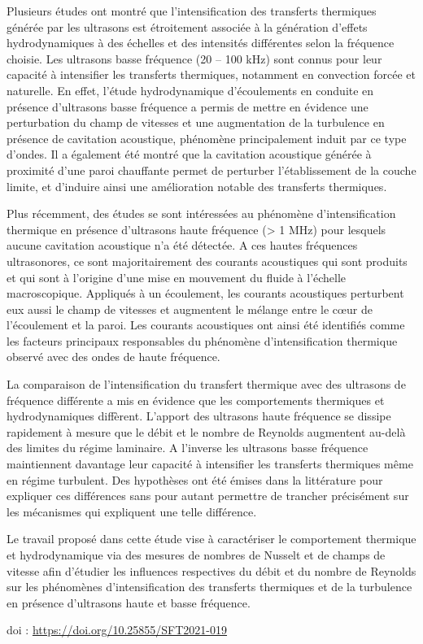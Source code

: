{\normalsize
Plusieurs études ont montré que l'intensification des transferts thermiques générée par les ultrasons est étroitement associée à la génération d'effets hydrodynamiques à des échelles et des intensités différentes selon la fréquence choisie. Les ultrasons basse fréquence (20 – 100 kHz) sont connus pour leur capacité à intensifier les transferts thermiques, notamment en convection forcée et naturelle. En effet, l'étude hydrodynamique d'écoulements en conduite en présence d'ultrasons basse fréquence a permis de mettre en évidence une perturbation du champ de vitesses et une augmentation de la turbulence en présence de cavitation acoustique, phénomène principalement induit par ce type d'ondes. Il a également été montré que la cavitation acoustique générée à proximité d'une paroi chauffante permet de perturber l'établissement de la couche limite, et d'induire ainsi une amélioration notable des transferts thermiques. 



Plus récemment, des études se sont intéressées au phénomène d'intensification thermique en présence d'ultrasons haute fréquence (> 1 MHz) pour lesquels aucune cavitation acoustique n'a été détectée. A ces hautes fréquences ultrasonores, ce sont majoritairement des courants acoustiques qui sont produits et qui sont à l'origine d'une mise en mouvement du fluide à l'échelle macroscopique. Appliqués à un écoulement, les courants acoustiques perturbent eux aussi le champ de vitesses et augmentent le mélange entre le cœur de l'écoulement et la paroi. Les courants acoustiques ont ainsi été identifiés comme les facteurs principaux responsables du phénomène d'intensification thermique observé avec des ondes de haute fréquence.



La comparaison de l'intensification du transfert thermique avec des ultrasons de fréquence différente a mis en évidence que les comportements thermiques et hydrodynamiques diffèrent. L'apport des ultrasons haute fréquence se dissipe rapidement à mesure que le débit et le nombre de Reynolds augmentent au-delà des limites du régime laminaire. A l'inverse les ultrasons basse fréquence maintiennent davantage leur capacité à intensifier les transferts thermiques même en régime turbulent. Des hypothèses ont été émises dans la littérature pour expliquer ces différences sans pour autant permettre de trancher précisément sur les mécanismes qui expliquent une telle différence. 



Le travail proposé dans cette étude vise à caractériser le comportement thermique et hydrodynamique via des mesures de nombres de Nusselt et de champs de vitesse afin d'étudier les influences respectives du débit et du nombre de Reynolds sur les phénomènes d'intensification des transferts thermiques et de la turbulence en présence d'ultrasons haute et basse fréquence.

 \vfill doi : \url{https://doi.org/10.25855/SFT2021-019}

}
 

